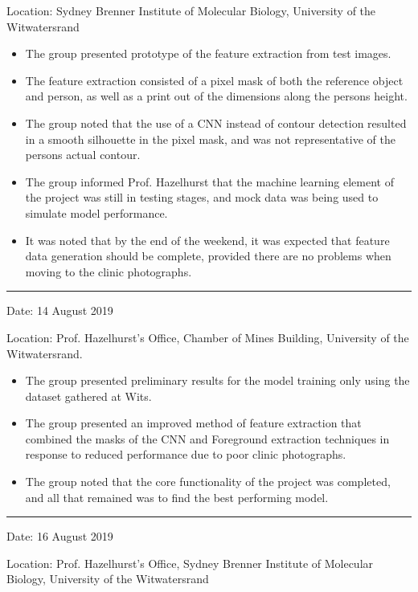 \documentclass[conference, onecolumn]{IEEEtran}
\begin{document}
Location: Sydney Brenner Institute of Molecular Biology, University of the Witwatersrand
\begin{itemize}
	\item The group presented prototype of the feature extraction from test images.
	\item The feature extraction consisted of a pixel mask of both the reference object and person, as well as a print out of the dimensions along the persons height.
	\item The group noted that the use of a CNN instead of contour detection resulted in a smooth silhouette in the pixel mask, and was not representative of the persons actual contour.
	\item The group informed Prof. Hazelhurst that the machine learning element of the project was still in testing stages, and mock data was being used to simulate model performance.
	\item It was noted that by the end of the weekend, it was expected that feature data generation should be complete, provided there are no problems when moving to the clinic photographs.
\end{itemize}

\rule{\linewidth}{2pt}

Date: 14 August 2019

Location: Prof. Hazelhurst's Office, Chamber of Mines Building, University of the Witwatersrand.
\begin{itemize}
	\item The group presented preliminary results for the model training only using the dataset gathered at Wits.
	\item The group presented an improved method of feature extraction that combined the masks of the CNN and Foreground extraction techniques in response to reduced performance due to poor clinic photographs.
	\item The group noted that the core functionality of the project was completed, and all that remained was to find the best performing model.
\end{itemize}

\rule{\linewidth}{2pt}

Date: 16 August 2019

Location: Prof. Hazelhurst's Office, Sydney Brenner Institute of Molecular Biology, University of the Witwatersrand
\end{document}
